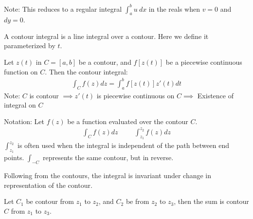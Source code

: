 \documentclass[12pt, english]{book}
\begin{document}
	Note: This reduces to a regular integral \(\int_{a}^{b} u \ dx\) in the reals when \(v = 0\) and \(dy = 0\).

	A contour integral is a line integral over a contour. Here we define it parameterized by \(t\).
	
	\begin{definition}
		\label{Contour Integral Definition - Complex}
		Let \(z(t)\) in \(C = [a, b]\) be a contour, and \(f[z(t)]\) be a piecewise continuous function on \(C\). Then the contour integral:
		\begin{align*}
			\int_{C} f(z) dz = \int_{a}^{b} f[z(t)] z'(t) dt
		\end{align*}
		Note: \(C\) is contour \(\implies z'(t)\) is piecewise continuous on \(C \implies\) Existence of integral on \(C\)
	\end{definition}
	
	Notation: 
	Let \(f(z)\) be a function evaluated over the contour \(C\).
	\begin{align*}
		\int_{C} f(z) dz &&& \int_{z_1}^{z_2} f(z) dz
	\end{align*}
	\(\int_{z_1}^{z_2}\) is often used when the integral is independent of the path between end points. \(\int_{-C}\) represents the same contour, but in reverse.
	
	Following from the contours, the integral is invariant under change in representation of the contour. 
	
	\begin{definition}
		\label{Sum (Contour) Definition - Complex}
		Let \(C_1\) be contour from \(z_1\) to \(z_2\), and \(C_2\) be from \(z_2\) to \(z_3\), then the sum is contour \(C\) from \(z_1\) to \(z_3\).
	\end{definition}

	\begin{figure}[H]
		\centering
	\end{figure}
	
\end{document}
